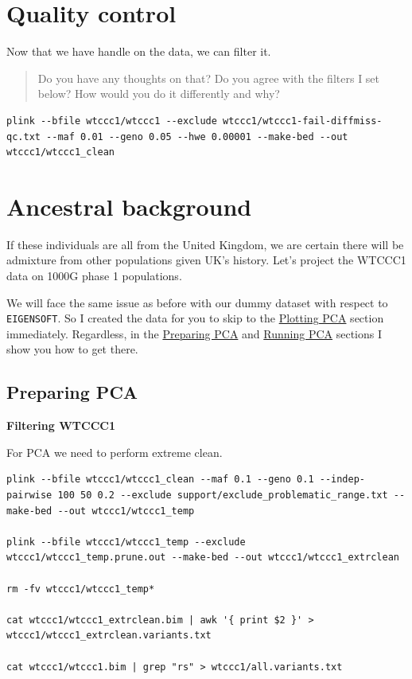 \documentclass[
]{book}
\newcommand{\passthrough}[1]{#1}
\begin{document}
\hypertarget{quality-control-1}{%
\section{Quality control}\label{quality-control-1}}

Now that we have handle on the data, we can filter it.

\begin{quote}
Do you have any thoughts on that? Do you agree with the filters I set below? How would you do it differently and why?
\end{quote}

\begin{lstlisting}
plink --bfile wtccc1/wtccc1 --exclude wtccc1/wtccc1-fail-diffmiss-qc.txt --maf 0.01 --geno 0.05 --hwe 0.00001 --make-bed --out wtccc1/wtccc1_clean
\end{lstlisting}

\hypertarget{ancestral-background-1}{%
\section{Ancestral background}\label{ancestral-background-1}}

If these individuals are all from the United Kingdom, we are certain there will be admixture from other populations given UK's history. Let's project the WTCCC1 data on 1000G phase 1 populations.

We will face the same issue as before with our dummy dataset with respect to \passthrough{\lstinline!EIGENSOFT!}. So I created the data for you to skip to the \protect\hyperlink{plotting-pca}{Plotting PCA} section immediately. Regardless, in the \protect\hyperlink{preparing-pca}{Preparing PCA} and \protect\hyperlink{running-pca}{Running PCA} sections I show you how to get there.

\hypertarget{preparing-pca}{%
\subsection{Preparing PCA}\label{preparing-pca}}

\textbf{Filtering WTCCC1}

For PCA we need to perform extreme clean.

\begin{lstlisting}
plink --bfile wtccc1/wtccc1_clean --maf 0.1 --geno 0.1 --indep-pairwise 100 50 0.2 --exclude support/exclude_problematic_range.txt --make-bed --out wtccc1/wtccc1_temp

plink --bfile wtccc1/wtccc1_temp --exclude wtccc1/wtccc1_temp.prune.out --make-bed --out wtccc1/wtccc1_extrclean

rm -fv wtccc1/wtccc1_temp*

cat wtccc1/wtccc1_extrclean.bim | awk '{ print $2 }' > wtccc1/wtccc1_extrclean.variants.txt

cat wtccc1/wtccc1.bim | grep "rs" > wtccc1/all.variants.txt
\end{lstlisting}
\end{document}
